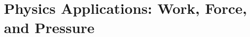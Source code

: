 \section{Physics Applications:  Work, Force, and Pressure} \label{S:6.4.Physics}



\newpage



\newpage



\newpage



\newpage

\clearpage
